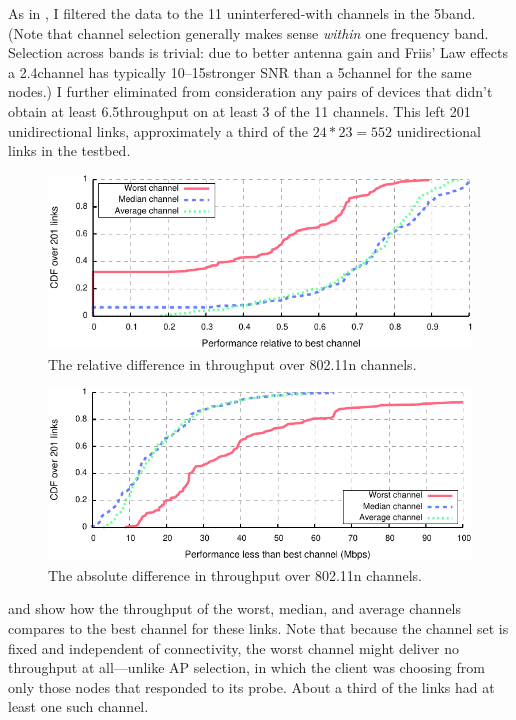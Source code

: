 As in , I filtered the data to the 11 uninterfered-with channels in the 5\GHz band. (Note that channel selection generally makes sense \emph{within} one frequency band. Selection across bands is trivial: due to better antenna gain and Friis' Law effects a 2.4\GHz channel has typically 10\dB--15\dB stronger SNR than a 5\GHz channel for the same nodes.) I further eliminated from consideration any pairs of devices that didn't obtain at least 6.5\Mbps throughput on at least 3 of the 11 channels. This left 201 unidirectional links, approximately a third of the $24*23=552$ unidirectional links in the testbed.

\begin{figure}[t]
	\centering
	\includegraphics[width=\textwidth]{figures/applications/chan_sel_rel_diff.pdf}
	\caption{\label{fig:chan_sel_rel_diff}The relative difference in throughput over 802.11n channels.}
\end{figure}

\begin{figure}[t]
	\centering
	\includegraphics[width=\textwidth]{figures/applications/chan_sel_tpt_diff.pdf}
	\caption{\label{fig:chan_sel_tpt_diff}The absolute difference in throughput over 802.11n channels.}
\end{figure}

 and  show how the throughput of the worst, median, and average channels compares to the best channel for these links. Note that because the channel set is fixed and independent of connectivity, the worst channel might deliver no throughput at all---unlike AP selection, in which the client was choosing from only those nodes that responded to its probe. About a third of the links had at least one such channel.


